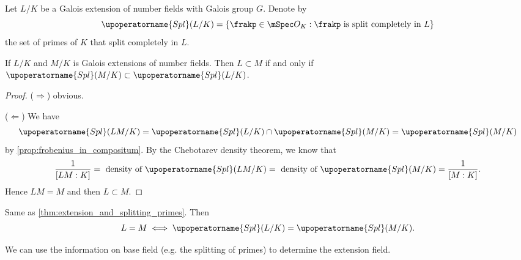     Let \(L/K\) be a Galois extension of number fields with Galois group \(G\).
    Denote by 
    \[ \upoperatorname{Spl}(L/K) = \{\frakp \in \mSpec O_K: \frakp \text{ is split completely in } L\} \]
    the set of primes of \(K\) that split completely in \(L\).
    
    \begin{theorem}\label{thm:extension_and_splitting_primes}
        If \(L/K\) and \(M/K\) is Galois extensions of number fields.
        Then \(L \subset M\) if and only if \(\upoperatorname{Spl}(M/K) \subset \upoperatorname{Spl}(L/K)\).
    \end{theorem}
    \begin{proof}
        (\(\Rightarrow\)) obvious.

        (\(\Leftarrow\)) We have 
        \[ \upoperatorname{Spl}(LM/K) = \upoperatorname{Spl}(L/K) \cap \upoperatorname{Spl}(M/K) = \upoperatorname{Spl}(M/K) \]
        by \cref{prop:frobenius_in_compositum}.
        By the Chebotarev density theorem, we know that 
        \[ \frac{1}{[LM:K]} = \text{ density of } \upoperatorname{Spl}(LM/K) = \text{ density of } \upoperatorname{Spl}(M/K) = \frac{1}{[M:K]}. \]
        Hence \(LM = M\) and then \(L \subset M\).
    \end{proof}

    \begin{corollary}
        Same as \cref{thm:extension_and_splitting_primes}.
        Then 
        \[ L = M \iff \upoperatorname{Spl}(L/K) = \upoperatorname{Spl}(M/K). \]
    \end{corollary}

    \begin{slogan}
        We can use the information on base field (e.g. the splitting of primes) to determine the extension field.
    \end{slogan}


